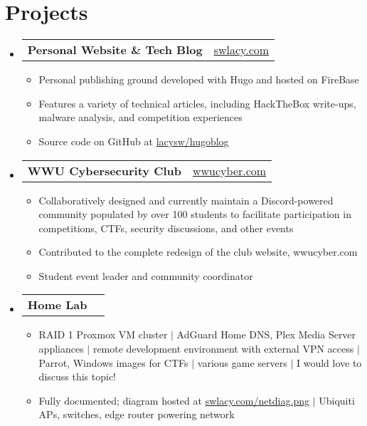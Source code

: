 \documentclass[10pt]{article}
\makeatletter
\newcommand{\resumeItem}[1]{
  \item\small{
    {#1 \vspace{-2pt}}
  }
}
\newcommand{\resumeProjectHeading}[2]{
    \item
    \begin{tabular*}{0.97\textwidth}{l@{\extracolsep{\fill}}r}
      \small#1 & #2 \\
    \end{tabular*}\vspace{-7pt}
}
\newcommand{\resumeSubHeadingListStart}{\begin{itemize}[leftmargin=0.15in, label={}]}
\newcommand{\resumeSubHeadingListEnd}{\end{itemize}}
\newcommand{\resumeItemListStart}{\begin{itemize}}
\newcommand{\resumeItemListEnd}{\end{itemize}\vspace{-5pt}}
\makeatother
\begin{document}
\section{Projects}
    \resumeSubHeadingListStart
      \resumeProjectHeading
          {\textbf{Personal Website \& Tech Blog}}{\href{https://swlacy.com}{swlacy.com}}
          \resumeItemListStart
            \resumeItem{Personal publishing ground developed with Hugo and hosted on FireBase}
            \resumeItem{Features a variety of technical articles, including HackTheBox write-ups, malware analysis, and competition experiences}
            \resumeItem{Source code on GitHub at \href{https://github.com/lacysw/hugoblog}{lacysw/hugoblog}}
          \resumeItemListEnd
      \resumeProjectHeading
          {\textbf{WWU Cybersecurity Club}}{\href{https://wwucyber.com}{wwucyber.com}}
          \resumeItemListStart
            \resumeItem{Collaboratively designed and currently maintain a Discord-powered community populated by over 100 students to facilitate participation in competitions, CTFs, security discussions, and other events}
            \resumeItem{Contributed to the complete redesign of the club website, wwucyber.com}
            \resumeItem{Student event leader and community coordinator}
          \resumeItemListEnd
      \resumeProjectHeading
          {\textbf{Home Lab}}{}
          \resumeItemListStart
            \resumeItem{RAID 1 Proxmox VM cluster $|$ AdGuard Home DNS, Plex Media Server appliances $|$ remote development environment with external VPN access $|$ Parrot, Windows images for CTFs $|$ various game servers $|$ I would love to discuss this topic!}
            \resumeItem{Fully documented; diagram hosted at \href{https://swlacy.com/netdiag.png}{swlacy.com/netdiag.png} $|$ Ubiquiti APs, switches, edge router powering network}
          \resumeItemListEnd
    \resumeSubHeadingListEnd
\end{document}
